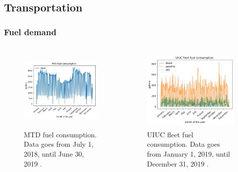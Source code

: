 \subsection{Transportation}
\begin{frame}
\frametitle{Fuel demand}
\begin{columns}
    \column[t]{5cm}
	\begin{figure}[htbp!]
		\begin{center}
			\includegraphics[height=4cm]{images/mtd2}
		\end{center}
		\caption{MTD fuel consumption. Data goes from July 1, 2018, until June 30, 2019 \cite{mtd_irecords_2019}.}
	\end{figure}

	\column[t]{5cm}
	\begin{figure}[htbp!]
		\begin{center}
			\includegraphics[height=4cm]{images/uiuc}
		\end{center}
		\caption{UIUC fleet fuel consumption. Data goes from January 1, 2019, until December 31, 2019 \cite{uiuc_personnal_communication}.}
	\end{figure}
\end{columns}
\end{frame}

